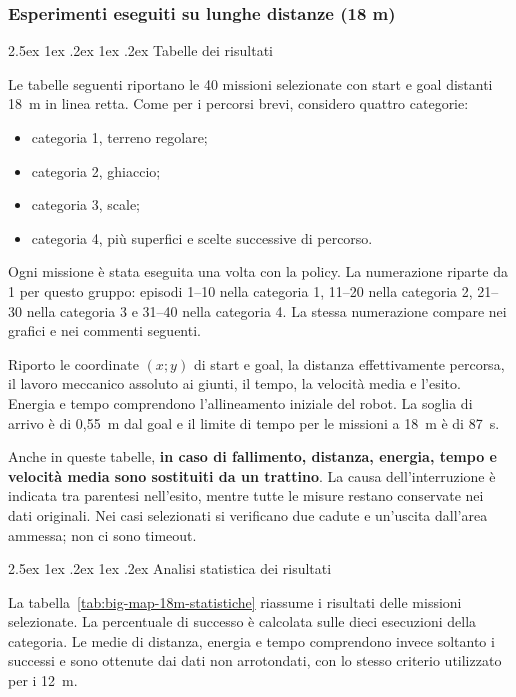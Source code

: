 \documentclass[11pt,a4paper]{article}
\makeatletter
\newcommand{\subsubsubsection}{%
  \@startsection{paragraph}{4}{\z@}%
  {2.5ex \@plus 1ex \@minus .2ex}%
  {1ex \@plus .2ex}%
  {\normalfont\normalsize\bfseries}}
\makeatother
\begin{document}
\subsubsection{Esperimenti eseguiti su lunghe distanze (18 m)}
\label{sec:risultati-big-map-18m}

\subsubsubsection{Tabelle dei risultati}

Le tabelle seguenti riportano le 40 missioni selezionate con start e goal distanti 18~m in linea retta. Come per i percorsi brevi, considero quattro categorie:
\begin{itemize}
\item categoria 1, terreno regolare;
\item categoria 2, ghiaccio;
\item categoria 3, scale;
\item categoria 4, più superfici e scelte successive di percorso.
\end{itemize}

Ogni missione è stata eseguita una volta con la policy. La numerazione riparte da 1 per questo gruppo: episodi 1--10 nella categoria 1, 11--20 nella categoria 2, 21--30 nella categoria 3 e 31--40 nella categoria 4. La stessa numerazione compare nei grafici e nei commenti seguenti.

Riporto le coordinate $(x;y)$ di start e goal, la distanza effettivamente percorsa, il lavoro meccanico assoluto ai giunti, il tempo, la velocità media e l'esito. Energia e tempo comprendono l'allineamento iniziale del robot. La soglia di arrivo è di 0,55~m dal goal e il limite di tempo per le missioni a 18~m è di 87~s.

Anche in queste tabelle, \textbf{in caso di fallimento, distanza, energia, tempo e velocità media sono sostituiti da un trattino}. La causa dell'interruzione è indicata tra parentesi nell'esito, mentre tutte le misure restano conservate nei dati originali. Nei casi selezionati si verificano due cadute e un'uscita dall'area ammessa; non ci sono timeout.



\subsubsubsection{Analisi statistica dei risultati}

La tabella~\ref{tab:big-map-18m-statistiche} riassume i risultati delle missioni selezionate. La percentuale di successo è calcolata sulle dieci esecuzioni della categoria. Le medie di distanza, energia e tempo comprendono invece soltanto i successi e sono ottenute dai dati non arrotondati, con lo stesso criterio utilizzato per i 12~m.
\end{document}
